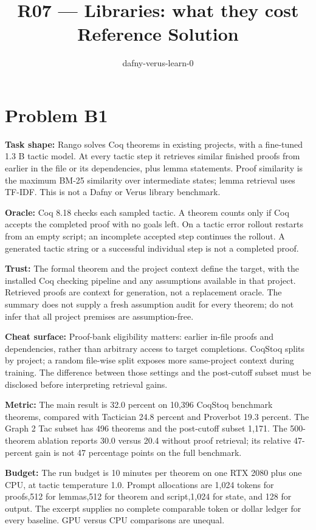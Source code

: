 \documentclass[11pt]{article}
\title{R07 --- Libraries: what they cost \\ \large Reference Solution}
\author{dafny-verus-learn-0}
\date{}
\begin{document}
\maketitle
\section*{Problem B1}\label{ans:B1}
\begin{answer}
\textbf{Task shape:} Rango solves Coq theorems in existing projects, with a fine-tuned 1.3 B tactic model. At every tactic step it retrieves similar finished proofs from earlier in the file or its dependencies, plus lemma statements. Proof similarity is the maximum BM-25 similarity over intermediate states; lemma retrieval uses TF-IDF. This is not a Dafny or Verus library benchmark.

\textbf{Oracle:} Coq 8.18 checks each sampled tactic. A theorem counts only if Coq accepts the completed proof with no goals left. On a tactic error rollout restarts from an empty script; an incomplete accepted step continues the rollout. A generated tactic string or a successful individual step is not a completed proof.

\textbf{Trust:} The formal theorem and the project context define the target, with the installed Coq checking pipeline and any assumptions available in that project. Retrieved proofs are context for generation, not a replacement oracle. The summary does not supply a fresh assumption audit for every theorem; do not infer that all project premises are assumption-free.

\textbf{Cheat surface:} Proof-bank eligibility matters: earlier in-file proofs and dependencies, rather than arbitrary access to target completions. CoqStoq splits by project; a random file-wise split exposes more same-project context during training. The difference between those settings and the post-cutoff subset must be disclosed before interpreting retrieval gains.

\textbf{Metric:} The main result is 32.0 percent on 10,396 CoqStoq benchmark theorems, compared with Tactician 24.8 percent and Proverbot 19.3 percent. The Graph 2 Tac subset has 496 theorems and the post-cutoff subset 1,171. The 500-theorem ablation reports 30.0 versus 20.4 without proof retrieval; its relative 47-percent gain is not 47 percentage points on the full benchmark.

\textbf{Budget:} The run budget is 10 minutes per theorem on one RTX 2080 plus one CPU, at tactic temperature 1.0. Prompt allocations are 1,024 tokens for proofs,512 for lemmas,512 for theorem and script,1,024 for state, and 128 for output. The excerpt supplies no complete comparable token or dollar ledger for every baseline. GPU versus CPU comparisons are unequal.


\end{answer}
\end{document}
